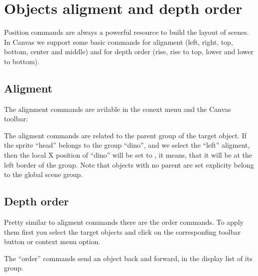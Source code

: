 \documentclass[letterpaper,10pt,english]{sphinxmanual}
\begin{document}
\section{Objects aligment and depth order}
\label{\detokenize{canvas:objects-aligment-and-depth-order}}
Position commands are always a powerful resource to build the layout of scenes. In Canvas we support some basic commands for alignment (left, right, top, bottom, center and middle) and for depth order (rise, rise to top, lower and lower to bottom).


\subsection{Aligment}
\label{\detokenize{canvas:aligment}}
The alignment commands are avilable in the conext menu and the Canvas toolbar:

\noindent{}

The aligment commands are related to the parent group of the target object. If the sprite “head” belongs to the group “dino”, and we select the “left” aligment, then the local X position of “dino” will be set to , it means, that it will be at the left border of the group. Note that objects with no parent are set explicity belong to the global scene group.


\subsection{Depth order}
\label{\detokenize{canvas:depth-order}}
Pretty similar to aligment commands there are the order commands. To apply them first you select the target objects and click on the corresponfing toolbar button or context menu option.

The “order” commands send an object back and forward, in the display list of its group.

\end{document}
